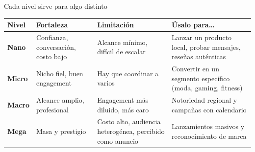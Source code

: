\documentclass[aspectratio=169,xcolor=dvipsnames]{beamer}
\begin{document}
\begin{frame}{Cada nivel sirve para algo distinto}
\centering
\footnotesize
\renewcommand{\arraystretch}{1.15}
\begin{tabular}{@{}p{1.6cm}p{3.3cm}p{3.4cm}p{4.6cm}@{}}
\toprule
\rowcolor{IPNguindaClara}\textbf{Nivel} & \textbf{Fortaleza} & \textbf{Limitación} & \textbf{Úsalo para\ldots}\\
\midrule
\textbf{Nano} & Confianza, conversación, costo bajo & Alcance mínimo, difícil de escalar & Lanzar un producto local, probar mensajes, reseñas auténticas\\
\textbf{Micro} & Nicho fiel, buen engagement & Hay que coordinar a varios & Convertir en un segmento específico (moda, gaming, fitness)\\
\textbf{Macro} & Alcance amplio, profesional & Engagement más diluido, más caro & Notoriedad regional y campañas con calendario\\
\textbf{Mega} & Masa y prestigio & Costo alto, audiencia heterogénea, percibido como anuncio & Lanzamientos masivos y reconocimiento de marca\\
\bottomrule
\end{tabular}
\end{frame}
\end{document}
